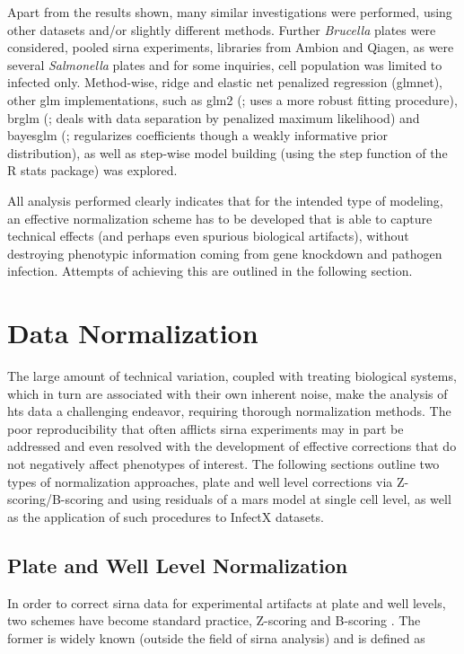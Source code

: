 Apart from the results shown, many similar investigations were performed, using other datasets and\slash or slightly different methods. Further \textit{Brucella} plates were considered, pooled \gls{sirna} experiments, libraries from Ambion and Qiagen, as were several \textit{Salmonella} plates and for some inquiries, cell population was limited to infected only. Method-wise, ridge and elastic net penalized regression (glmnet), other glm implementations, such as glm2 (\cite{Marschner2011}; uses a more robust fitting procedure), brglm (\cite{Kosmidis2007}; deals with data separation by penalized maximum likelihood) and bayesglm (\cite{Gelman2007}; regularizes coefficients though a weakly informative prior distribution), as well as step-wise model building (using the step function of the R stats package) was explored.


All analysis performed clearly indicates that for the intended type of modeling, an effective normalization scheme has to be developed that is able to capture technical effects (and perhaps even spurious biological artifacts), without destroying phenotypic information coming from gene knockdown and pathogen infection. Attempts of achieving this are outlined in the following section.

\section{Data Normalization}
\label{sec:data-normalization}
The large amount of technical variation, coupled with treating biological systems, which in turn are associated with their own inherent noise, make the analysis of \gls{hts} data a challenging endeavor, requiring thorough normalization methods. The poor reproducibility that often afflicts \gls{sirna} experiments may in part be addressed and even resolved with the development of effective corrections that do not negatively affect phenotypes of interest. The following sections outline two types of normalization approaches, plate and well level corrections via Z-scoring\slash B-scoring and using residuals of a \gls{mars} model at single cell level, as well as the application of such procedures to InfectX datasets.

\subsection{Plate and Well Level Normalization}
In order to correct \gls{sirna} data for experimental artifacts at plate and well levels, two schemes have become standard practice, Z-scoring and B-scoring \citep{Malo2006}. The former is widely known (outside the field of \gls{sirna} analysis) and is defined as

